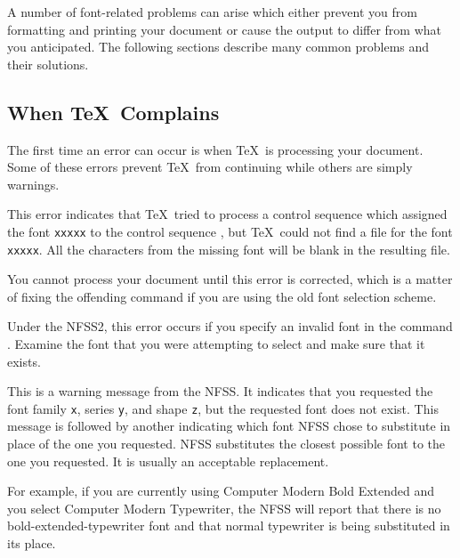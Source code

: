 A number of font-related problems can arise which either prevent you
from formatting and printing your document or cause the output to differ
from what you anticipated.  The following sections describe many common
problems and their solutions.

\subsection{When \protect\TeX\ Complains}

The first time an error can occur is when \TeX\ is processing your
document.  Some of these errors prevent \TeX\ from continuing while
others are simply warnings. 

\begin{iplist}{.25in}
\ipitem[\texttt{! Font \bs myfont=xxxxx not loadable: %
               Metric (TFM) file not found.}]

This error indicates that \TeX\ tried to process a  control sequence which
assigned the font \texttt{xxxxx} to the control sequence , but \TeX\
could not find a  file for the font \texttt{xxxxx}.  All the characters
from the missing font will be blank in the resulting \ext{DVI} file.

You cannot process your document until this error is corrected, which is 
a matter of fixing the offending \cs{font} command if 
you are using the old font selection scheme.

Under the NFSS2, this error occurs if you specify
an invalid font in the command .  
Examine the font that you were attempting to select
and make sure that it exists.


This is a warning message from the NFSS.  It indicates
that you requested the font family \texttt{x}, series \texttt{y}, and shape
\texttt{z},
but the requested font does not exist.  This message is followed by 
another indicating
which font NFSS chose to substitute in place of the one you requested.
NFSS substitutes the closest possible font to the one you requested.
It is usually an acceptable replacement.

For example, if you are currently using Computer Modern Bold Extended and
you select Computer Modern Typewriter, the NFSS will report that there
is no bold-extended-typewriter font and that normal typewriter is being
substituted in its place.


\end{iplist}
